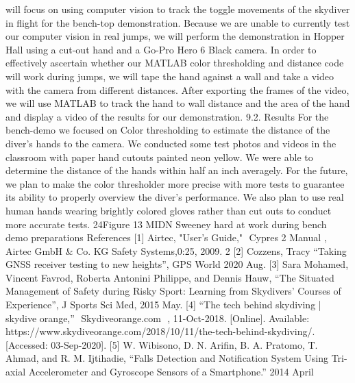 will focus on using computer vision to track the toggle movements of the skydiver in flight for the bench-top
demonstration. Because we are unable to currently test our computer vision in real jumps, we will perform the
demonstration in Hopper Hall using a cut-out hand and a Go-Pro Hero 6 Black camera. In order to effectively ascertain
whether our MATLAB color thresholding and distance code will work during jumps, we will tape the hand against a wall
and take a video with the camera from different distances. After exporting the frames of the video, we will use MATLAB
to track the hand to wall distance and the area of the hand and display a video of the results for our demonstration.
9.2.
Results
For the bench-demo we focused on Color thresholding to estimate the distance of the diver’s hands to the camera. We
conducted some test photos and videos in the classroom with paper hand cutouts painted neon yellow. We were able to
determine the distance of the hands within half an inch averagely. For the future, we plan to make the color thresholder
more precise with more tests to guarantee its ability to properly overview the diver’s performance. We also plan to use
real human hands wearing brightly colored gloves rather than cut outs to conduct more accurate tests.
24Figure 13 MIDN Sweeney hard at work during bench demo preparations
References
[1] Airtec, "User’s Guide," ​ Cypres 2 Manual , ​ Airtec GmbH & Co. KG Safety Systems,0:25, 2009. 2
[2] Cozzens, Tracy “Taking GNSS receiver testing to new heights”, GPS World 2020 Aug.
[3] Sara Mohamed, Vincent Favrod, Roberta Antonini Philippe, and Dennis Hauw, “The Situated Management of Safety
during Risky Sport: Learning from Skydivers’ Courses of Experience”, J Sports Sci Med, 2015 May.
[4] “The tech behind skydiving | skydive orange,” ​ Skydiveorange.com ​ , 11-Oct-2018. [Online]. Available:
https://www.skydiveorange.com/2018/10/11/the-tech-behind-skydiving/. [Accessed: 03-Sep-2020].
[5] W. Wibisono, D. N. Arifin, B. A. Pratomo, T. Ahmad, and R. M. Ijtihadie, “Falls Detection and Notification System
Using Tri-axial Accelerometer and Gyroscope Sensors of a Smartphone.” 2014 April
